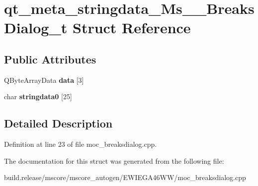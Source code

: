 \hypertarget{structqt__meta__stringdata___ms_____breaks_dialog__t}{}\section{qt\+\_\+meta\+\_\+stringdata\+\_\+\+Ms\+\_\+\+\_\+\+Breaks\+Dialog\+\_\+t Struct Reference}
\label{structqt__meta__stringdata___ms_____breaks_dialog__t}
\subsection*{Public Attributes}
\begin{DoxyCompactItemize}
\item 
\mbox{\label{structqt__meta__stringdata___ms_____breaks_dialog__t_abd7d0c0a3fbe8583b1547e6d96fa8a26}} 
Q\+Byte\+Array\+Data {\bfseries data} \mbox{[}3\mbox{]}
\item 
\mbox{\label{structqt__meta__stringdata___ms_____breaks_dialog__t_aac01a217dbf55ab7f9f6df6f6b5be5eb}} 
char {\bfseries stringdata0} \mbox{[}25\mbox{]}
\end{DoxyCompactItemize}


\subsection{Detailed Description}


Definition at line 23 of file moc\+\_\+breaksdialog.\+cpp.



The documentation for this struct was generated from the following file\+:\begin{DoxyCompactItemize}
\item 
build.\+release/mscore/mscore\+\_\+autogen/\+E\+W\+I\+E\+G\+A46\+W\+W/moc\+\_\+breaksdialog.\+cpp\end{DoxyCompactItemize}
